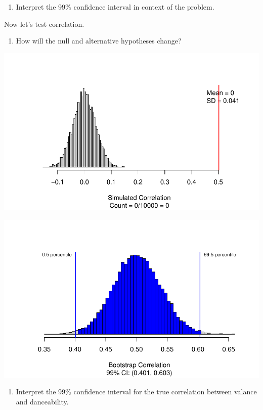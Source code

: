 \documentclass[
]{report}
\providecommand{\tightlist}{%
  \setlength{\itemsep}{0pt}\setlength{\parskip}{0pt}}
\begin{document}
\begin{enumerate}
\def\labelenumi{\arabic{enumi}.}
\setcounter{enumi}{7}
\tightlist
\item
  Interpret the 99\% confidence interval in context of the problem.
\end{enumerate}

\vspace{1in}

Now let's test correlation.

\begin{enumerate}
\def\labelenumi{\arabic{enumi}.}
\setcounter{enumi}{8}
\tightlist
\item
  How will the null and alternative hypotheses change?
\end{enumerate}

\vspace{0.5in}

\begin{center}\includegraphics[width=0.7\linewidth]{14-UR-module13_review_files/figure-latex/unnamed-chunk-5-1} \end{center}

\begin{center}\includegraphics[width=0.7\linewidth]{14-UR-module13_review_files/figure-latex/unnamed-chunk-6-1} \end{center}

\begin{enumerate}
\def\labelenumi{\arabic{enumi}.}
\setcounter{enumi}{9}
\tightlist
\item
  Interpret the 99\% confidence interval for the true correlation between valance and danceability.
\end{enumerate}
\end{document}
